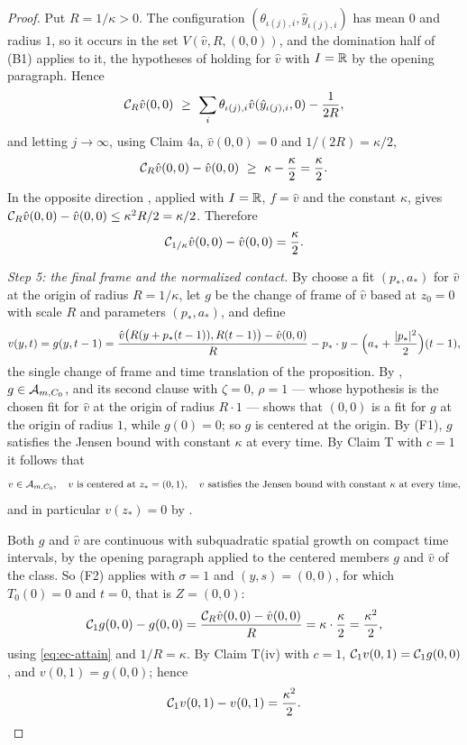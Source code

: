 \begin{proof}
Put $R=1/\kappa>0$. The configuration
$(\theta_{\iota(j),i},\hat y_{\iota(j),i})$ has mean $0$ and radius $1$, so it
occurs in the set $V(\hat v,R,(0,0))$, and the domination half of (B1) applies
to it, the hypotheses of  holding for
$\hat v$ with $I=\mathbb{R}$ by the opening paragraph. Hence
\[
  \mathcal{C}_R\hat v(0,0)\ \ge\
    \sum_i\theta_{\iota(j),i}\hat v(\hat y_{\iota(j),i},0)-\frac{1}{2R},
\]
and letting $j\to\infty$, using Claim 4a, $\hat v(0,0)=0$ and
$1/(2R)=\kappa/2$,
\[
  \Cenv_R\hat v(0,0)-\hat v(0,0)\ \ge\ \kappa-\frac\kappa2=\frac\kappa2 .
\]
In the opposite direction , applied with $I=\mathbb{R}$,
$f=\hat v$ and the constant $\kappa$, gives
$\mathcal{C}_R\hat v(0,0)-\hat v(0,0)\le\kappa^2R/2=\kappa/2$. Therefore
\begin{equation}\label{eq:ec-attain}
  \mathcal{C}_{1/\kappa}\hat v(0,0)-\hat v(0,0)=\frac\kappa2 .
\end{equation}

\emph{Step 5: the final frame and the normalized contact.}
By  choose a fit $(p_*,a_*)$ for $\hat v$ at the origin of
radius $R=1/\kappa$, let $g$ be the change of frame \noderef{FrameChange} of
$\hat v$ based at $z_0=0$ with scale $R$ and parameters $(p_*,a_*)$, and define
\[
  v(y,t)=g(y,t-1)
   =\frac{\hat v\bigl(R(y+p_*(t-1)),R(t-1)\bigr)-\hat v(0,0)}{R}
     -p_*\cdot y-\Bigl(a_*+\frac{|p_*|^2}{2}\Bigr)(t-1),
\]
the single change of frame and time translation of the proposition. By
\noderef{FrameInvariance}, $g\in\mathcal{A}_{m,C_0}$, and its second clause with
$\zeta=0$, $\rho=1$ --- whose hypothesis is the chosen fit for $\hat v$ at the
origin of radius $R\cdot1$ --- shows that $(0,0)$ is a fit for $g$ at the origin
of radius $1$, while $g(0)=0$; so $g$ is centered at the origin. By (F1), $g$
satisfies the Jensen bound with constant $\kappa$ at every time. By Claim T with
$c=1$ it follows that
\begin{equation}\label{eq:ec-final}
  v\in\mathcal{A}_{m,C_0},\quad v\text{ is centered at }z_*=(0,1),\quad
  v\text{ satisfies the Jensen bound with constant }\kappa
  \text{ at every time},
\end{equation}
and in particular $v(z_*)=0$ by .

Both $g$ and $\hat v$ are continuous with subquadratic spatial growth on compact
time intervals, by the opening paragraph applied to the centered members $g$ and
$\hat v$ of the class. So (F2) applies with $\sigma=1$ and $(y,s)=(0,0)$, for
which $T_0(0)=0$ and $t=0$, that is $Z=(0,0)$:
\[
  \mathcal{C}_1g(0,0)-g(0,0)=\frac{\mathcal{C}_R\hat v(0,0)-\hat v(0,0)}{R}
    =\kappa\cdot\frac{\kappa}{2}=\frac{\kappa^2}{2},
\]
using \eqref{eq:ec-attain} and $1/R=\kappa$. By Claim T(iv) with $c=1$,
$\mathcal{C}_1v(0,1)=\mathcal{C}_1g(0,0)$, and $v(0,1)=g(0,0)$; hence
\begin{equation}\label{eq:ec-contact}
  \mathcal{C}_1v(0,1)-v(0,1)=\frac{\kappa^2}{2}.
\end{equation}


\end{proof}

